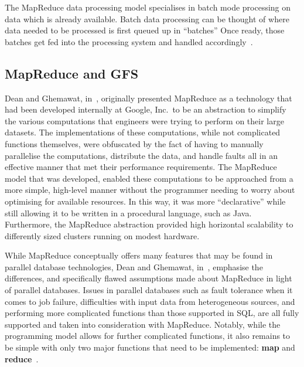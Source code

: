 The MapReduce data processing model specialises in batch mode processing on data which is already available.
Batch data processing can be thought of where data needed to be processed is first queued up in ``batches''
Once ready, those batches get fed into the processing system and handled accordingly~\cite{condie2010online}.


\subsection{MapReduce and GFS} %
\label{ssub:mapreduce_and_gfs}

Dean and Ghemawat, in~\cite{dean_mapreduce:_2008}, originally presented MapReduce as a technology that had been
developed internally at Google, Inc.\ to be an abstraction to simplify the various computations that engineers were
trying to perform on their large datasets. The implementations of these computations, while not complicated functions
themselves, were obfuscated by the fact of having to manually parallelise the computations, distribute the data, and
handle faults all in an effective manner that met their performance requirements. The MapReduce model that was developed,
enabled these computations to be approached from a more simple, high-level manner without the programmer needing to worry
about optimising for available resources. In this way, it was more ``declarative'' while still allowing it to be written
in a procedural language, such as Java. Furthermore, the MapReduce abstraction provided high horizontal scalability to
differently sized clusters running on modest hardware.

While MapReduce conceptually offers many features that may be found in parallel database technologies, Dean and
Ghemawat, in~\cite{dean2010mapreduce}, emphasise the differences, and specifically flawed assumptions made about MapReduce
in light of parallel databases. Issues in parallel databases such as fault tolerance when it comes to job failure,
difficulties with input data from heterogeneous sources, and performing more complicated functions than those supported
in SQL, are all fully supported and taken into consideration with MapReduce. Notably, while the programming model
allows for further complicated functions, it also remains to be simple with only two major functions that need to be
implemented: \textbf{map} and \textbf{reduce}~\cite{pavlo2009comparison}.


